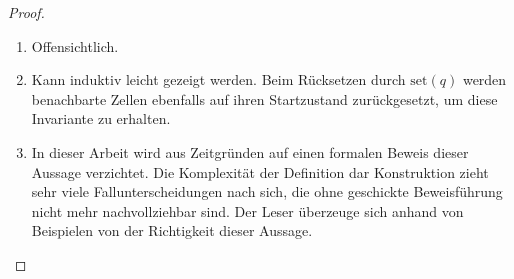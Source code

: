 \begin{proof}
    \begin{enumerate}
        \item Offensichtlich.
        \item Kann induktiv leicht gezeigt werden.
            Beim Rücksetzen durch $\mathrm{set}(q)$ werden benachbarte Zellen ebenfalls auf ihren Startzustand zurückgesetzt, um diese Invariante zu erhalten.
        \item
            In dieser Arbeit wird aus Zeitgründen auf einen formalen Beweis dieser Aussage verzichtet.
            Die Komplexität der Definition dar Konstruktion zieht sehr viele Fallunterscheidungen nach sich,
            die ohne geschickte Beweisführung nicht mehr nachvollziehbar sind.
            Der Leser überzeuge sich anhand von Beispielen von der Richtigkeit dieser Aussage.
    \end{enumerate}
\end{proof}

